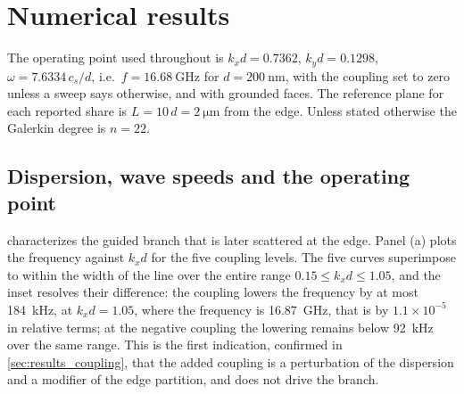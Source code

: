 \section{Numerical results}
\label{sec:results}

The operating point used throughout is
$k_xd=0.7362$, $k_yd=0.1298$, $\omega=7.6334\,c_s/d$, i.e.\
$f=\SI{16.68}{\giga\hertz}$ for $d=\SI{200}{\nano\metre}$, with the coupling
set to zero unless a sweep says otherwise, and with grounded faces.  The reference plane for each reported share is $L=10\,d=\SI{2}{\micro\metre}$ from
the edge.  Unless stated otherwise the Galerkin degree is $n=22$.

\subsection{Dispersion, wave speeds and the operating point}
\label{sec:results_dispersion}
\label{sec:results_scope}

 characterizes the guided branch that is later scattered at the
edge.  Panel (a) plots the frequency against $k_xd$ for the five coupling
levels.  The five curves superimpose to within the width of the line over the entire range $0.15\le k_xd\le1.05$, and the inset resolves their difference: the
coupling lowers the frequency by at most \SI{184}{\kilo\hertz}, at
$k_xd=1.05$, where the frequency is \SI{16.87}{\giga\hertz}, that is by
$1.1\times10^{-5}$ in relative terms; at the negative coupling the lowering remains below \SI{92}{\kilo\hertz} over the same range.  This is the first indication, confirmed in \cref{sec:results_coupling},
that the added coupling is a perturbation of the dispersion and a modifier of the edge partition, and does not drive the branch.

